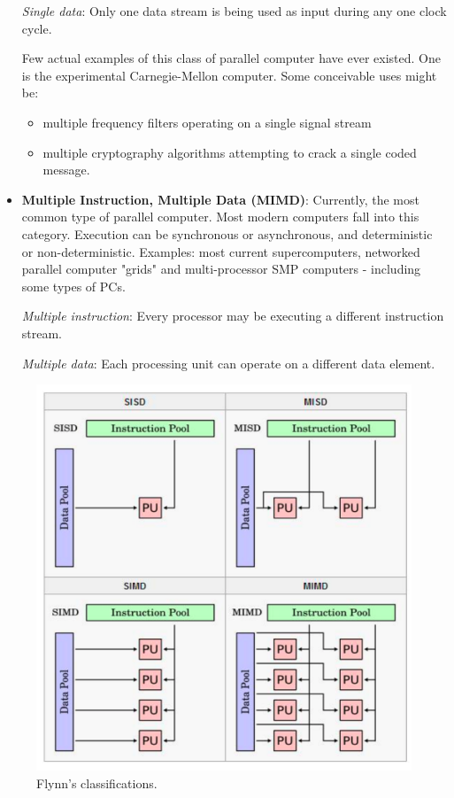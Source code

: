 \begin{itemize}
\textit{Single data}: Only one data stream is being used as input during any one clock cycle. 

Few actual examples of this class of parallel computer have ever existed. One is the experimental Carnegie-Mellon computer. Some conceivable uses might be:  \begin{itemize}
\item multiple frequency filters operating on a single signal stream  
\item multiple cryptography algorithms attempting to crack a single coded message.  
\end{itemize}

\item \textbf{Multiple Instruction, Multiple Data (MIMD)}: Currently, the most common type of parallel computer. Most modern computers fall 
into this category. Execution can be synchronous or asynchronous, and deterministic or non-deterministic. Examples: most current supercomputers, networked parallel computer "grids" and multi-processor SMP computers - including some types of PCs.  

\textit{Multiple instruction}: Every processor may be executing a different instruction stream.

\textit{Multiple data}: Each processing unit can operate on a different data element.
\end{itemize}

\begin{figure}
\centering
\includegraphics[width=0.7\linewidth]{figures/screenshot052}
\caption{Flynn's classifications.}
\label{fig:screenshot052}
\end{figure}


